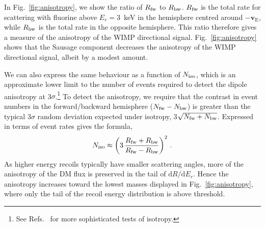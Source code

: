 \documentclass[prd,10pt,twocolumn,showpacs,nofootinbib, aps,superscriptaddress,preprintnumbers]{revtex4-1}
\begin{document}
In Fig.~\ref{fig:anisotropy}, we show the ratio of $R_{\rm fw}$ to $R_{\rm bw}$.
$R_{\rm fw}$ is the total rate for scattering with fluorine above $E_r = 3$~keV
in the hemisphere centred around $-\mathbf{v}_{\mathrm{E}}$, while
$R_{\rm bw}$ is the total rate in the opposite hemisphere.
This ratio therefore gives a measure of the anisotropy of the WIMP
directional signal. Fig.~\ref{fig:anisotropy} shows that the Sausage
component decreases the anisotropy of the WIMP
directional signal, albeit by a modest amount.

%
%

We can also express the same behaviour as a function of $N_{\rm iso}$, 
which is an approximate lower limit to the number of events
 required to detect the dipole anisotropy at 3$\sigma$.\footnote{See Refs.~\cite{Green:2010zm,Billard:2009mf,Mayet:2016zxu} for more sophisticated tests of isotropy.} 
 To detect the anisotropy, we require that the contrast in event numbers in the forward/backward hemisphere 
 ($N_{\rm fw} - N_{\rm bw}$) is greater than the typical 3$\sigma$ random deviation expected under isotropy, 3$\sqrt{N_{\rm fw}+N_{\rm bw}}$. 
 Expressed in terms of event rates gives the formula,
\begin{equation}
N_{\rm iso} \approx \left( 3 \, \frac{R_{\rm fw} + R_{\rm bw}}{R_{\rm fw} - R_{\rm bw}} \right)^2 \, .
\end{equation}
As higher energy recoils typically have smaller
scattering angles, more of the anisotropy of the DM flux is preserved
in the tail of $\textrm{d}R/\textrm{d}E_r$. Hence the anisotropy
increases toward the lowest masses displayed in Fig.~\ref{fig:anisotropy}, where only
 the tail of the recoil energy distribution is above threshold. 
 
\end{document}
